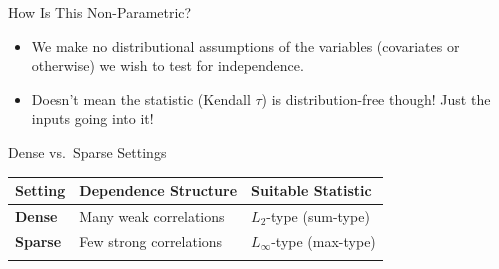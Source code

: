 \documentclass[
  ignorenonframetext,
]{beamer}
\providecommand{\tightlist}{%
  \setlength{\itemsep}{0pt}\setlength{\parskip}{0pt}}
\begin{document}
\begin{frame}{How Is This Non-Parametric?}
\label{how-is-this-non-parametric}
\begin{itemize}
\tightlist
\item
  We make no distributional assumptions of the variables (covariates or
  otherwise) we wish to test for independence.
\item
  Doesn't mean the statistic (Kendall \(\tau\)) is distribution-free
  though! Just the inputs going into it!
\end{itemize}
\end{frame}

\begin{frame}{Dense vs.~Sparse Settings}
\label{dense-vs.-sparse-settings}
\begin{longtable}[]{@{}lll@{}}
\toprule\noalign{}
Setting & Dependence Structure & Suitable Statistic \\
\midrule\noalign{}
\endhead
\textbf{Dense} & Many weak correlations & \(L_2\)-type (sum-type) \\
\textbf{Sparse} & Few strong correlations & \(L_\infty\)-type
(max-type) \\
\bottomrule\noalign{}
\end{longtable}
\end{frame}
\end{document}
